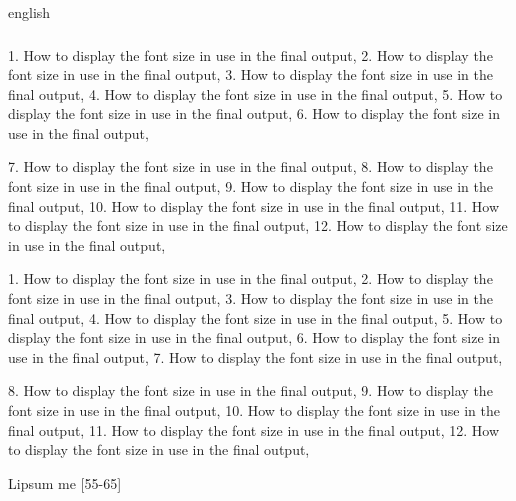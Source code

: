 \begin{otherlanguage*}{english}
    \subsubsection{\showfont}

    1. How to display the font size in use in the final output,
    2. How to display the font size in use in the final output,
    3. How to display the font size in use in the final output,
    4. How to display the font size in use in the final output,
    5. How to display the font size in use in the final output,
    6. How to display the font size in use in the final output,

    7. How to display the font size in use in the final output,
    8. How to display the font size in use in the final output,
    9. How to display the font size in use in the final output,
    10. How to display the font size in use in the final output,
    11. How to display the font size in use in the final output,
    12. How to display the font size in use in the final output,

    \subsubsubsection{\showfont}

    1. How to display the font size in use in the final output,
    2. How to display the font size in use in the final output,
    3. How to display the font size in use in the final output,
    4. How to display the font size in use in the final output,
    5. How to display the font size in use in the final output,
    6. How to display the font size in use in the final output,
    7. How to display the font size in use in the final output,

    8. How to display the font size in use in the final output,
    9. How to display the font size in use in the final output,
    10. How to display the font size in use in the final output,
    11. How to display the font size in use in the final output,
    12. How to display the font size in use in the final output,


    Lipsum me [55-65]

\end{otherlanguage*}


